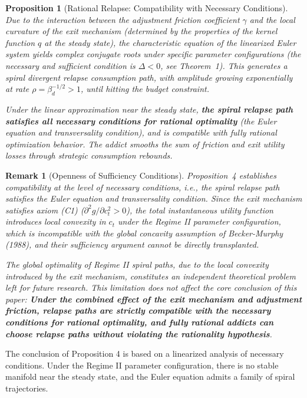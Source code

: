 \documentclass[12pt]{article}
\newtheorem{proposition}{Proposition}
\newtheorem{remark}{Remark}
\begin{document}
\begin{proposition}[Rational Relapse: Compatibility with Necessary Conditions]
Due to the interaction between the adjustment friction coefficient $\gamma$ and the local curvature of the exit mechanism (determined by the properties of the kernel function $q$ at the steady
state), the characteristic equation of the linearized Euler system yields complex conjugate roots under specific parameter configurations
(the necessary and sufficient condition is $\Delta < 0$, see Theorem~1). This generates a spiral divergent
relapse consumption path, with amplitude growing exponentially at rate $\rho = \beta_d^{-1/2} > 1$, until hitting the
budget constraint.
 
Under the linear approximation near the steady state, \textbf{the spiral relapse path satisfies all necessary conditions for rational optimality}
(the Euler equation and transversality condition), and is compatible with fully rational optimization behavior. The addict
smooths the sum of friction and exit utility losses through strategic consumption rebounds.
\end{proposition}
\begin{remark}[Openness of Sufficiency Conditions]
Proposition~4 establishes compatibility at the level of necessary conditions, i.e., the spiral relapse path satisfies the Euler equation and
transversality condition. Since the exit mechanism satisfies axiom (C1) ($\partial^2 g/\partial c_t^2 > 0$),
the total instantaneous utility function introduces local convexity in $c_t$ under the Regime II parameter configuration, which is incompatible with
the global concavity assumption of Becker-Murphy (1988), and their sufficiency argument cannot be directly
transplanted.
 
The global optimality of Regime II spiral paths, due to the local convexity introduced by the exit mechanism, constitutes an independent theoretical
problem left for future research. This limitation does not affect the core conclusion of this paper: \textbf{Under the combined effect of the exit mechanism
and adjustment friction, relapse paths are strictly compatible with the necessary conditions for rational optimality, and fully
rational addicts can choose relapse paths without violating the rationality hypothesis}.
\end{remark}
The conclusion of Proposition 4 is based on a linearized analysis of necessary conditions. Under the Regime II parameter configuration, there is no stable manifold near the steady state,
and the Euler equation admits a family of spiral trajectories.
\end{document}
